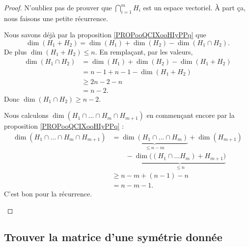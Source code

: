 \begin{proof}
	N'oubliez pas de prouver que \( \bigcap_{i=1}^mH_i\) est un espace vectoriel. À part ça, nous faisons une petite récurrence.
	\begin{subproof}
		\spitem[Pour \( m=2\)]
		Nous savons déjà par la proposition \ref{PROPooQCIXooHIyPPq} que
		\begin{equation}
			\dim(H_1 + H_2)=\dim(H_1)+\dim(H_2)-\dim(H_1\cap H_2).
		\end{equation}
		De plus \( \dim(H_1+H_2)\leq n\). En remplaçant, par les valeurs,
		\begin{subequations}
			\begin{align}
				\dim(H_1\cap H_2) & =\dim(H_1)+\dim(H_2)-\dim(H_1+ H_2) \\
				                  & =n-1+n-1-\dim(H_1+H_2)                 \\
				                  & \geq 2n-2-n                            \\
				                  & =n-2.
			\end{align}
		\end{subequations}
		Donc \( \dim(H_1\cap H_2)\geq n-2\).

		\spitem[La récurrence]
		Nous calculons \( \dim(H_1\cap\ldots\cap H_m\cap H_{m+1})\) en commençant encore par la proposition \ref{PROPooQCIXooHIyPPq} :
		\begin{subequations}
			\begin{align}
				\dim(H_1\cap \ldots\cap H_m\cap H_{m+1}) & =\underbrace{\dim(H_1\cap\ldots\cap H_m)}_{\leq n-m}+\dim(H_{m+1})        \\
				                                         & \qquad -\underbrace{\dim\big( (H_1\cap\ldots H_m)+H_{m+1} \big)}_{\leq n} \\
				                                         & \geq n-m+(n-1)-n                                                          \\
				                                         & =n-m-1.
			\end{align}
		\end{subequations}
		C'est bon pour la récurrence.
	\end{subproof}
\end{proof}

\subsection{Trouver la matrice d'une symétrie donnée}
\label{SubSecMtrSym}

